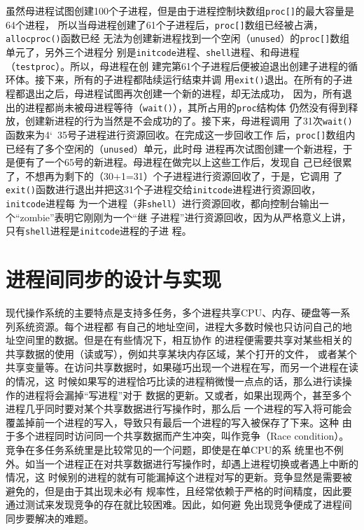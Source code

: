 \documentclass{swfcthesismscctex}
\begin{document}
虽然母进程试图创建100个子进程，但是由于进程控制块数组\texttt{proc[]}的最大容量是64个进程，
所以当母进程创建了61个子进程后，\texttt{proc[]}数组已经被占满，\texttt{allocproc()}函数已经
无法为创建新进程找到一个空闲（\texttt{unused}）的\texttt{proc[]}数组单元了，另外三个进程分
别是\texttt{initcode}进程、\texttt{shell}进程、和母进程（\texttt{testproc}）。所以，母进程在创
建完第61个子进程后便被迫退出创建子进程的循环体。接下来，所有的子进程都陆续运行结束并调
用\texttt{exit()}退出。在所有的子进程都退出之后，母进程试图再次创建一个新的进程，却无法成功，
因为，所有退出的进程都尚未被母进程等待（\texttt{wait()}），其所占用的\texttt{proc}结构体
仍然没有得到释放，创建新进程的行为当然是不会成功的了。接下来，母进程调用
了31次\texttt{wait()}函数来为4\char`~35号子进程进行资源回收。在完成这一步回收工作
后，\texttt{proc[]}数组内已经有了多个空闲的（\texttt{unused}）单元，此时母
进程再次试图创建一个新进程，于是便有了一个65号的新进程。母进程在做完以上这些工作后，发现自
己已经很累了，不想再为剩下的（30+1=31）个子进程进行资源回收了，于是，它调用
了\texttt{exit()}函数进行退出并把这31个子进程交给\texttt{initcode}进程进行资源回收，\texttt{initcode}进程每
为一个进程（非\texttt{shell}）进行资源回收，都向控制台输出一个``zombie''表明它刚刚为一个``继
子进程''进行资源回收，因为从严格意义上讲，只有\texttt{shell}进程是\texttt{initcode}进程的子进
程。

\section{进程间同步的设计与实现}

现代操作系统的主要特点是支持多任务，多个进程共享CPU、内存、硬盘等一系列系统资源。每个进程都
有自己的地址空间，进程大多数时候也只访问自己的地址空间里的数据。但是在有些情况下，相互协作
的进程便需要共享对某些相关的共享数据的使用（读或写），例如共享某块内存区域，某个打开的文件，
或者某个共享变量等。在访问共享数据时，如果碰巧出现一个进程在写，而另一个进程在读的情况，这
时候如果写的进程恰巧比读的进程稍微慢一点点的话，那么进行读操作的进程将会漏掉``写进程''对于
数据的更新。又或者，如果出现两个，甚至多个进程几乎同时要对某个共享数据进行写操作时，那么后
一个进程的写入将可能会覆盖掉前一个进程的写入，导致只有最后一个进程的写入被保存了下来。这种
由于多个进程同时访问同一个共享数据而产生冲突，叫作竞争（Race
condition）\cite{TAHanzinger04}。竞争在多任务系统里是比较常见的一个问题，即使是在单CPU的系
统里也不例外。如当一个进程正在对共享数据进行写操作时，却遇上进程切换或者遇上中断的情况，这
时候别的进程的就有可能漏掉这个进程对写的更新。竞争显然是需要被避免的，但是由于其出现未必有
规率性，且经常依赖于严格的时间精度，因此要通过测试来发现竞争的存在就比较困难。因此，如何避
免出现竞争便成了进程间同步要解决的难题。
\end{document}
